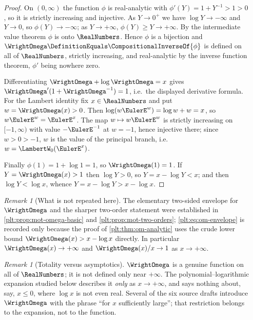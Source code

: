 \documentclass[11pt,oneside]{article}
\theoremstyle{plain}
\theoremstyle{definition}
\theoremstyle{remark}
\newtheorem{remark}[theorem]{Remark}
\newcommand{\rev}[1]{\CompositionalInverseOf{#1}}
\begin{document}
\begin{proof}
On \((0,\infty)\) the function \(\phi\) is real-analytic with
\(\phi'(Y)=1+Y^{-1}>1>0\), so it is strictly increasing and injective.  As
\(Y\to0^{+}\) we have \(\log Y\to-\infty\) and \(Y\to0\), so
\(\phi(Y)\to-\infty\); as \(Y\to+\infty\), \(\phi(Y)\ge Y\to+\infty\).  By
the intermediate value theorem \(\phi\) is onto \(\RealNumbers\).  Hence
\(\phi\) is a bijection and \(\WrightOmega\DefinitionEquals\rev{\phi}\) is
defined on all of \(\RealNumbers\), strictly increasing, and real-analytic by
the inverse function theorem, \(\phi'\) being nowhere zero.

Differentiating \(\WrightOmega+\log\WrightOmega=x\) gives
\(\WrightOmega'(1+\WrightOmega^{-1})=1\), i.e.\ the displayed derivative
formula.  For the Lambert identity fix \(x\in\RealNumbers\) and put
\(w=\WrightOmega(x)>0\).  Then
\(\log(w\EulerE^{w})=\log w+w=x\), so \(w\EulerE^{w}=\EulerE^{x}\).  The map
\(w\mapsto w\EulerE^{w}\) is strictly increasing on \([-1,\infty)\) with value
\(-\EulerE^{-1}\) at \(w=-1\), hence injective there; since \(w>0>-1\), \(w\)
is the value of the principal branch, i.e.\ \(w=\LambertW_0(\EulerE^{x})\).

Finally \(\phi(1)=1+\log1=1\), so \(\WrightOmega(1)=1\).  If
\(Y=\WrightOmega(x)>1\) then \(\log Y>0\), so \(Y=x-\log Y<x\); and then
\(\log Y<\log x\), whence \(Y=x-\log Y>x-\log x\).
\end{proof}

\begin{remark}[What is not repeated here]
\label{plt:rmk:om-envelope}
The elementary two-sided envelope for \(\WrightOmega\) and the sharper
two-order statement were established in \cref{plt:prop:mot-omega-basic} and
\cref{plt:prop:mot-two-orders}; \cref{plt:eq:om-envelope} is recorded only
because the proof of \cref{plt:thm:om-analytic} uses the crude lower bound
\(\WrightOmega(x)>x-\log x\) directly.  In particular
\(\WrightOmega(x)\to+\infty\) and \(\WrightOmega(x)/x\to1\) as
\(x\to+\infty\).
\end{remark}

\begin{remark}[Totality versus asymptotics]
\label{plt:rmk:om-total}
\(\WrightOmega\) is a genuine function on all of \(\RealNumbers\); it is not
defined only near \(+\infty\).  The polynomial--logarithmic expansion studied
below describes it \emph{only} as \(x\to+\infty\), and says nothing about,
say, \(x\le0\), where \(\log x\) is not even real.  Several of the six source
drafts introduce \(\WrightOmega\) with the phrase ``for \(x\) sufficiently
large''; that restriction belongs to the expansion, not to the function.
\end{remark}
\end{document}
